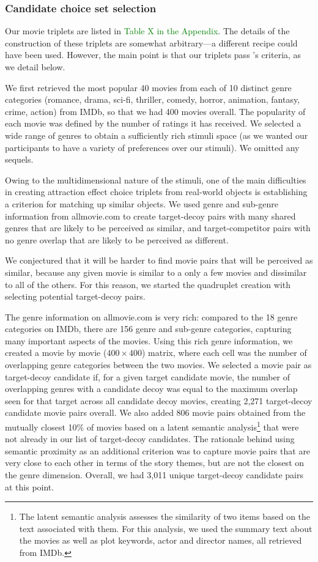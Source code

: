 \documentclass[12pt, a4paper]{article}
\newcommand{\NS}[1] {{\textcolor{green}{#1}}}
\begin{document}
\subsubsection{Candidate choice set selection}

Our movie triplets are listed in \NS{Table X in the Appendix}. The details of the construction of these triplets are somewhat arbitrary---a different recipe could have been used. However, the main point is that our triplets pass \citeauthor{Huber2014}'s \citeyear{Huber2014} criteria, as we detail below.

We first retrieved the most popular 40 movies from each of 10 distinct genre categories (romance, drama, sci-fi, thriller, comedy, horror, animation, fantasy, crime, action) from IMDb, so that we had 400 movies overall. The popularity of each movie was defined by the number of ratings it has received. We selected a wide range of genres to obtain a sufficiently rich stimuli space (as we wanted our participants to have a variety of preferences over our stimuli). We omitted any sequels.

Owing to the multidimensional nature of the stimuli, one of the main difficulties in creating attraction effect choice triplets from real-world objects is establishing a criterion for matching up similar objects. We used genre and sub-genre information from allmovie.com to create target-decoy pairs with many shared genres that are likely to be perceived as similar, and target-competitor pairs with no genre overlap that are likely to be perceived as different.

We conjectured that it will be harder to find movie pairs that will be perceived as similar, because any given movie is similar to a only a few movies and dissimilar to all of the others. For this reason, we started the quadruplet creation with selecting potential target-decoy pairs.

The genre information on allmovie.com is very rich: compared to the 18 genre categories on IMDb, there are 156 genre and sub-genre categories, capturing many important aspects of the movies. Using this rich genre information, we created a movie by movie ($400 \times 400$) matrix, where each cell was the number of overlapping genre categories between the two movies. We selected a movie pair as target-decoy candidate if, for a given target candidate movie, the number of overlapping genres with a candidate decoy was equal to the maximum overlap seen for that target across all candidate decoy movies, creating 2,271 target-decoy candidate movie pairs overall.
We also added 806 movie pairs obtained from the mutually closest 10\% of movies based on a latent semantic analysis\footnote{The latent semantic analysis assesses the similarity of two items based on the text associated with them. For this analysis, we used the summary text about the movies as well as plot keywords, actor and director names, all retrieved from IMDb.} that were not already in our list of target-decoy candidates. The rationale behind using semantic proximity as an additional criterion was to capture movie pairs that are very close to each other in terms of the story themes, but are not the closest on the genre dimension. Overall, we had 3,011 unique target-decoy candidate pairs at this point.
\end{document}
